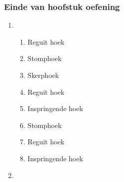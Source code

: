{\begin{multicols}{3}
\subsubsection*{Einde van hoofstuk oefening} %
\begin{enumerate}[noitemsep, label=\textbf{\arabic*}.]
      \item %
	  \begin{enumerate}[noitemsep, label=\textbf{(\alph*)} ]
		\item Reguit hoek
\item Stomphoek
\item Skerphoek
\item Reguit hoek
\item Inspringende hoek
\item Stomphoek
\item Reguit hoek
\item Inspringende hoek
	  \end{enumerate}

      \item %
      \begin{enumerate}[noitemsep, label=\textbf{(\alph*)} ]


\end{enumerate}
\end{enumerate}
\end{multicols}}
